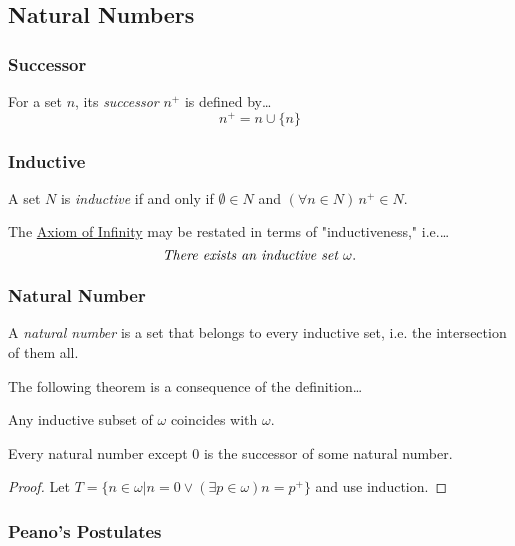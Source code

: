 \subsection{Natural Numbers}\label{naturalnumbers}

\subsubsection{Successor}\label{successor}
For a set $n$, its \emph{successor} $n^+$ is defined by\dots
$$n^+ = n \cup \{ n\}$$

\subsubsection{Inductive}\label{inductive}
A set $N$ is \emph{inductive}\label{inductive} if and only if $\emptyset \in N$ and $(\forall n \in N) \, n^+ \in N.$\newline

\noindent The \hyperref[statementofsetaxioms]{Axiom of Infinity} may be restated in terms of "inductiveness," i.e.\dots $$\emph{There exists an inductive set } \omega.$$

\subsubsection{Natural Number}
A \emph{natural number} is a set that belongs to every inductive set, i.e. the intersection of them all.\newline

\noindent The following theorem is a consequence of the definition\dots

\begin{theorem}
Any inductive subset of $\omega$ coincides with $\omega$.
\end{theorem}

\begin{proposition}
Every natural number except $0$ is the successor of some natural number.
\end{proposition}

\begin{proof}
Let $T = \{n \in \omega | n=0 \lor (\exists p \in \omega) n = p^+\}$ and use induction.
\end{proof}

\subsubsection{Peano's Postulates}

